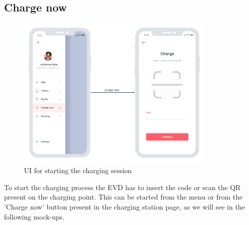 \subsection{Charge now}
\begin{figure}[H]
    \centering
    \includegraphics[width=0.85\textwidth]{Images/cp3/chargeNow.png}
    \caption{UI for starting the charging session}
\end{figure}
To start the charging process the EVD has to insert the code or scan the QR present on the charging point. This can be started from the menu or from the 'Charge now' button present in the charging station page, as we will see in the following mock-ups. 


